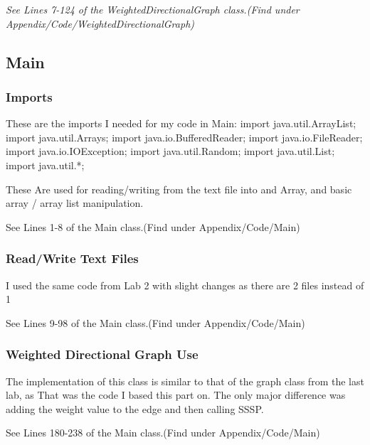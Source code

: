 \documentclass[10pt]{article}
\begin{document}
\newline

\emph{\normalfont
See Lines 7-124 of the WeightedDirectionalGraph class.(Find under Appendix/Code/WeightedDirectionalGraph)}

\subsection{Main}\label{operations}

\subsubsection{Imports}

These are the imports I needed for my code in Main:
\newline
import java.util.ArrayList;
\newline
import java.util.Arrays;
\newline
import java.io.BufferedReader;
\newline
import java.io.FileReader;
\newline
import java.io.IOException;
\newline
import java.util.Random;
\newline
import java.util.List;
\newline
import java.util.*;


These Are used for reading/writing from the text file into and Array, and basic array / array list manipulation.

See Lines 1-8 of the Main class.(Find under Appendix/Code/Main)

\subsubsection{Read/Write Text Files}
I used the same code from Lab 2 with slight changes as there are 2 files instead of 1

See Lines 9-98 of the Main class.(Find under Appendix/Code/Main)

\subsubsection{Weighted Directional Graph Use}
The implementation of this class is similar to that of the graph class from the last lab, as That was the code I based this part on. The only major difference was adding the weight value to the edge and then calling SSSP.

See Lines 180-238 of the Main class.(Find under Appendix/Code/Main)
\end{document}
